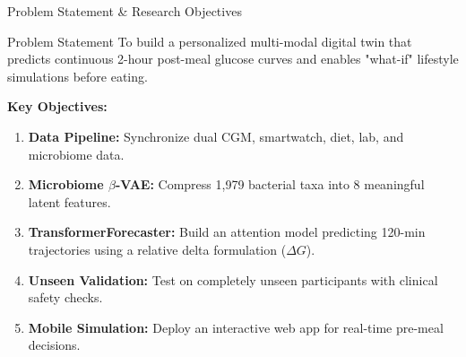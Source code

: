 \documentclass[aspectratio=169, 10pt]{beamer}
\begin{document}
\begin{frame}{Problem Statement \& Research Objectives}
  \begin{block}{Problem Statement}
    To build a personalized multi-modal digital twin that predicts continuous 2-hour post-meal glucose curves and enables "what-if" lifestyle simulations before eating.
  \end{block}
  
  \vspace{0.3cm}
  \textbf{Key Objectives:}
  \begin{enumerate}\setlength{\itemsep}{0.5em}
    \item \textbf{Data Pipeline:} Synchronize dual CGM, smartwatch, diet, lab, and microbiome data.
    \item \textbf{Microbiome $\beta$-VAE:} Compress 1,979 bacterial taxa into 8 meaningful latent features.
    \item \textbf{TransformerForecaster:} Build an attention model predicting 120-min trajectories using a relative delta formulation ($\Delta G$).
    \item \textbf{Unseen Validation:} Test on completely unseen participants with clinical safety checks.
    \item \textbf{Mobile Simulation:} Deploy an interactive web app for real-time pre-meal decisions.
  \end{enumerate}
\end{frame}
\end{document}
